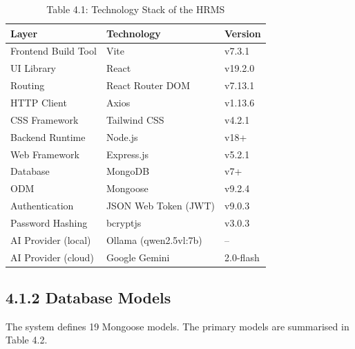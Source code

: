 \documentclass[12pt,a4paper]{report}
\begin{document}
\begin{table}[H]
\centering
\caption{Table 4.1: Technology Stack of the HRMS}
\begin{tabular}{lll}
\toprule
\textbf{Layer} & \textbf{Technology} & \textbf{Version} \\
\midrule
Frontend Build Tool & Vite & v7.3.1 \\
UI Library & React & v19.2.0 \\
Routing & React Router DOM & v7.13.1 \\
HTTP Client & Axios & v1.13.6 \\
CSS Framework & Tailwind CSS & v4.2.1 \\
Backend Runtime & Node.js & v18+ \\
Web Framework & Express.js & v5.2.1 \\
Database & MongoDB & v7+ \\
ODM & Mongoose & v9.2.4 \\
Authentication & JSON Web Token (JWT) & v9.0.3 \\
Password Hashing & bcryptjs & v3.0.3 \\
AI Provider (local) & Ollama (qwen2.5vl:7b) & -- \\
AI Provider (cloud) & Google Gemini & 2.0-flash \\
\bottomrule
\end{tabular}
\end{table}

\subsection{4.1.2 Database Models}

The system defines 19 Mongoose models. The primary models are summarised in Table 4.2.
\end{document}
